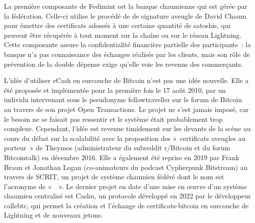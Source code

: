 
La première composante de Fedimint est la banque chaumienne qui est gérée par la fédération. Celle-ci utilise le procédé de de signature aveugle de David Chaum pour émettre des certificats adossés à une certaine quantité de satoshis, qui peuvent être récupérés à tout moment sur la chaîne ou sur le réseau Lightning. Cette composante assure la confidentialité financière partielle des participants~: la banque n'a pas connaissance des échanges réalisés par les clients, mais son rôle de prévention de la double dépense exige qu'elle voie les revenus des commerçants.

L'idée d'utiliser eCash en surcouche de Bitcoin n'est pas une idée nouvelle. Elle a été proposée et implémentée pour la première fois le 17 août 2010, par un individu intervenant sous le pseudonyme fellowtraveller sur le forum de Bitcoin au travers de son projet Open Transactions. Le projet ne s'est jamais imposé, car le besoin ne se faisait pas ressentir et le système était probablement trop complexe. Cependant, l'idée est revenue timidement sur les devants de la scène au cours du débat sur la scalabilité avec la proposition des «~certificats aveugles au porteur~» de Theymos (administrateur du subreddit r/Bitcoin et du forum Bitcointalk) en décembre 2016. Elle a également été reprise en 2019 par Frank Braun et Jonathan Logan (co-animateurs du podcast Cypherpunk Bitstream) au travers de SCRIT, un projet de système chaumien fédéré dont le nom est l'acronyme de «~~». Le dernier projet en date d'une mise en œuvre d'un système chaumien centralisé est Cashu, un protocole développé en 2022 par le développeur callebtc, qui permet la création et l'échange de certificats-bitcoin en surcouche de Lightning et de nouveaux jetons.

